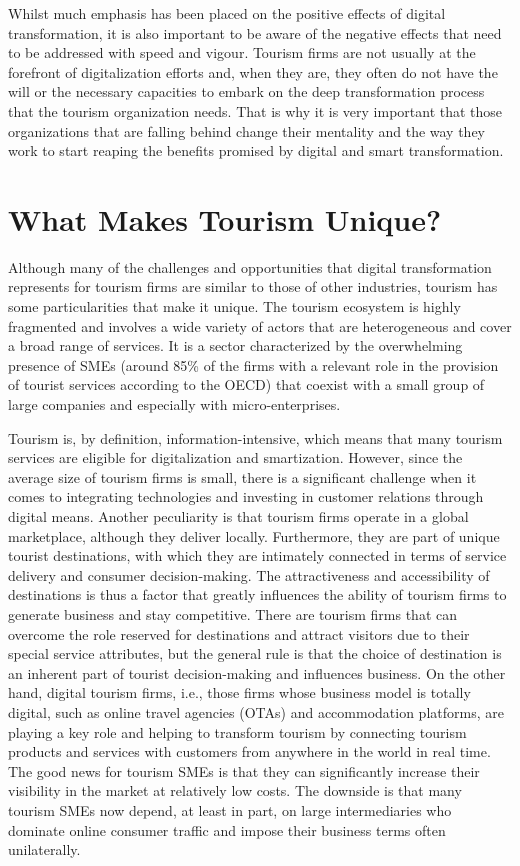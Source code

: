 \documentclass[
  letterpaper,
  DIV=11,
  numbers=noendperiod]{scrreprt}
\begin{document}
Whilst much emphasis has been placed on the positive effects of digital
transformation, it is also important to be aware of the negative effects
that need to be addressed with speed and vigour. Tourism firms are not
usually at the forefront of digitalization efforts and, when they are,
they often do not have the will or the necessary capacities to embark on
the deep transformation process that the tourism organization needs.
That is why it is very important that those organizations that are
falling behind change their mentality and the way they work to start
reaping the benefits promised by digital and smart transformation.

\hypertarget{what-makes-tourism-unique}{%
\section{What Makes Tourism Unique?}\label{what-makes-tourism-unique}}

Although many of the challenges and opportunities that digital
transformation represents for tourism firms are similar to those of
other industries, tourism has some particularities that make it unique.
The tourism ecosystem is highly fragmented and involves a wide variety
of actors that are heterogeneous and cover a broad range of services. It
is a sector characterized by the overwhelming presence of SMEs (around
85\% of the firms with a relevant role in the provision of tourist
services according to the OECD) that coexist with a small group of large
companies and especially with micro-enterprises.

Tourism is, by definition, information-intensive, which means that many
tourism services are eligible for digitalization and smartization.
However, since the average size of tourism firms is small, there is a
significant challenge when it comes to integrating technologies and
investing in customer relations through digital means. Another
peculiarity is that tourism firms operate in a global marketplace,
although they deliver locally. Furthermore, they are part of unique
tourist destinations, with which they are intimately connected in terms
of service delivery and consumer decision-making. The attractiveness and
accessibility of destinations is thus a factor that greatly influences
the ability of tourism firms to generate business and stay competitive.
There are tourism firms that can overcome the role reserved for
destinations and attract visitors due to their special service
attributes, but the general rule is that the choice of destination is an
inherent part of tourist decision-making and influences business. On the
other hand, digital tourism firms, i.e., those firms whose business
model is totally digital, such as online travel agencies (OTAs) and
accommodation platforms, are playing a key role and helping to transform
tourism by connecting tourism products and services with customers from
anywhere in the world in real time. The good news for tourism SMEs is
that they can significantly increase their visibility in the market at
relatively low costs. The downside is that many tourism SMEs now depend,
at least in part, on large intermediaries who dominate online consumer
traffic and impose their business terms often unilaterally.
\end{document}
